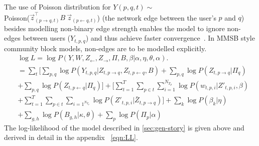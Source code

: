 \documentclass{sig-alternate}
\begin{document}
The use of Poisson distribution for $Y(p,q,t) \sim$ \\
    Poisson(${\overset{\rightarrow}{z}}^{\top}_{(p
\rightarrow q,t)} B~\overset{\rightarrow}{z}_{(p \leftarrow q,t)}$) (the 
network edge between the user's $p$ and $q$) besides modelling non-binary edge
strength enables the model to ignore non-edges between users ($Y_{t,p,q}$) and
thus achieve faster convergence~\cite{Kerrer:Newman}. In MMSB style community block models, 
	 non-edges are to be modelled
explicitly.
\small
\begin{align}
	&	\log L = \log \! P(Y, W, Z_{\leftarrow}, 
Z_{\rightarrow}, \Pi, B, \beta | \alpha, \eta, \theta, \alpha). \nonumber \\
      &= \sum_{t} \bigg[ \sum_{p,q} \! \log P(Y_{t,p, q} | Z_{t,p \rightarrow q} 
      , Z_{t,p \leftarrow q}, B) \nonumber  
      + \sum_{p,q} \log P(Z_{t, p \rightarrow q} | \Pi_q) \\ \nonumber 
      & + \sum_{p,q} \log \! P(Z_{t, p \leftarrow q} | \Pi_{q}) \bigg] 
      + \bigg[ \sum_{t=1}^{T} \! \sum_{p \in t} \sum_{i=1}^{N_{T_{p}}} 
      \log \! P(w_{t,p,i} | Z'_{t,p,i}, \beta) \\ \nonumber 
      & + \sum_{t=1}^{T} \sum_{p \in t} \sum_{i=1^{N_{T_{p}}}} \log \! 
      P(Z'_{t,p,i} | \bar{Z}_{t, p \rightarrow q}) \bigg] + \sum_{k} \log P(\beta_{k} | 
      \eta)  
      \\ & +  \sum_{g,h} \log P(B_{g,h} | \kappa, \theta)
	  + \sum_{p} \log \! P(\Pi_{p} | \alpha)
 \label{eqn:LL}
\end{align}
\normalsize
The log-likelihood of the model described in \ref{sec:gen-story} is given
 above and derived in detail in the appendix ~\ref{eqn:LL}.
\end{document}

